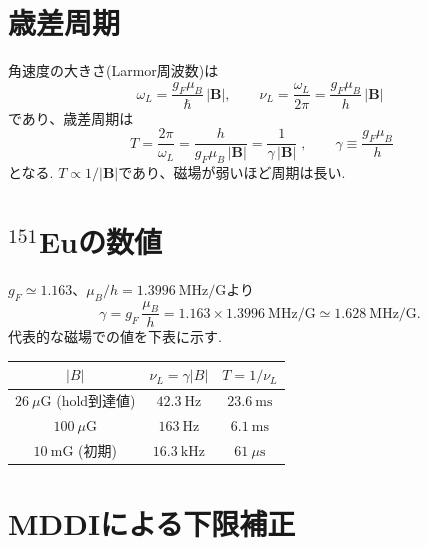 \documentclass[11pt]{ltjsarticle}
\newcommand{\Bv}{\bm{B}}
\begin{document}
\section{歳差周期}

角速度の大きさ(Larmor周波数)は
\begin{equation}
  \omega_L = \frac{g_F\mu_B}{\hbar}\,|\Bv|,
  \qquad
  \nu_L = \frac{\omega_L}{2\pi} = \frac{g_F\mu_B}{h}\,|\Bv|
\end{equation}
であり、歳差周期は
\begin{equation}
  \boxed{\;T = \frac{2\pi}{\omega_L} = \frac{h}{g_F\mu_B\,|\Bv|} = \frac{1}{\gamma\,|\Bv|}\;},
  \qquad
  \gamma\equiv\frac{g_F\mu_B}{h}
  \label{eq:period}
\end{equation}
となる.
$T\propto1/|\Bv|$であり、磁場が弱いほど周期は長い.

\section{${}^{151}$Euの数値}

$g_F\simeq1.163$、$\mu_B/h=1.3996\ \mathrm{MHz/G}$より
\begin{equation}
  \gamma = g_F\,\frac{\mu_B}{h} = 1.163\times1.3996\ \mathrm{MHz/G}
  \simeq 1.628\ \mathrm{MHz/G}.
\end{equation}
代表的な磁場での値を下表に示す.
\begin{center}
\begin{tabular}{ccc}
  \toprule
  $|B|$ & $\nu_L=\gamma|B|$ & $T=1/\nu_L$ \\
  \midrule
  $26\ \mu\mathrm{G}$ (hold到達値) & $42.3\ \mathrm{Hz}$ & $23.6\ \mathrm{ms}$ \\
  $100\ \mu\mathrm{G}$ & $163\ \mathrm{Hz}$ & $6.1\ \mathrm{ms}$ \\
  $10\ \mathrm{mG}$ (初期) & $16.3\ \mathrm{kHz}$ & $61\ \mu\mathrm{s}$ \\
  \bottomrule
\end{tabular}
\end{center}

\section{MDDIによる下限補正}
\end{document}
